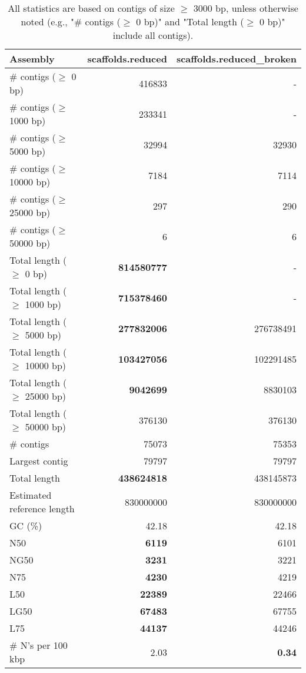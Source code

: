 \documentclass[12pt,a4paper]{article}
\begin{document}
\begin{table}[ht]
\begin{center}
\caption{All statistics are based on contigs of size $\geq$ 3000 bp, unless otherwise noted (e.g., "\# contigs ($\geq$ 0 bp)" and "Total length ($\geq$ 0 bp)" include all contigs).}
\begin{tabular}{|l*{2}{|r}|}
\hline
Assembly & scaffolds.reduced & scaffolds.reduced\_broken \\ \hline
\# contigs ($\geq$ 0 bp) & 416833 & - \\ \hline
\# contigs ($\geq$ 1000 bp) & 233341 & - \\ \hline
\# contigs ($\geq$ 5000 bp) & 32994 & 32930 \\ \hline
\# contigs ($\geq$ 10000 bp) & 7184 & 7114 \\ \hline
\# contigs ($\geq$ 25000 bp) & 297 & 290 \\ \hline
\# contigs ($\geq$ 50000 bp) & 6 & 6 \\ \hline
Total length ($\geq$ 0 bp) & {\bf 814580777} & - \\ \hline
Total length ($\geq$ 1000 bp) & {\bf 715378460} & - \\ \hline
Total length ($\geq$ 5000 bp) & {\bf 277832006} & 276738491 \\ \hline
Total length ($\geq$ 10000 bp) & {\bf 103427056} & 102291485 \\ \hline
Total length ($\geq$ 25000 bp) & {\bf 9042699} & 8830103 \\ \hline
Total length ($\geq$ 50000 bp) & 376130 & 376130 \\ \hline
\# contigs & 75073 & 75353 \\ \hline
Largest contig & 79797 & 79797 \\ \hline
Total length & {\bf 438624818} & 438145873 \\ \hline
Estimated reference length & 830000000 & 830000000 \\ \hline
GC (\%) & 42.18 & 42.18 \\ \hline
N50 & {\bf 6119} & 6101 \\ \hline
NG50 & {\bf 3231} & 3221 \\ \hline
N75 & {\bf 4230} & 4219 \\ \hline
L50 & {\bf 22389} & 22466 \\ \hline
LG50 & {\bf 67483} & 67755 \\ \hline
L75 & {\bf 44137} & 44246 \\ \hline
\# N's per 100 kbp & 2.03 & {\bf 0.34} \\ \hline
\end{tabular}
\end{center}
\end{table}
\end{document}

